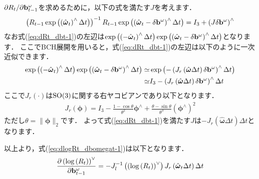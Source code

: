 $\partial R_{t} / \partial {\bf b}_{t-1}^{\omega}$を求めるために，以下の式を満たす$J$を考えます．
%
\begin{align}
  \left( R_{t-1} \exp \left( \left( \hat{ \boldsymbol \omega }_{t} \right)^{\wedge} \Delta t \right) \right)^{-1} R_{t-1} \exp \left( \left( \hat{ \boldsymbol \omega }_{t} - \delta {\bf b}^{\omega} \right)^{\wedge} \Delta t \right)
  = 
  I_{3} + \left( J \delta {\bf b}^{\omega} \right)^{\wedge}
  \label{eq:dRt_dbt-1}
\end{align}
%
なお式(\ref{eq:dRt_dbt-1})の左辺は$\exp \left( \left( - \hat{ \boldsymbol \omega }_{t} \right)^{\wedge} \Delta t \right) \exp \left( \left( \hat{ \boldsymbol \omega }_{t} - \delta {\bf b}^{\omega} \right)^{\wedge} \Delta t \right)$となります．
ここでBCH展開を用いると，式(\ref{eq:dRt_dbt-1})の左辺は以下のように一次近似できます．
%
\begin{align}
  \begin{split}
    \exp \left( \left( - \hat{ \boldsymbol \omega }_{t} \right)^{\wedge} \Delta t \right) \exp \left( \left( \hat{ \boldsymbol \omega }_{t} - \delta {\bf b}^{\omega} \right)^{\wedge} \Delta t \right)
%
    \simeq &
%
    \exp \left( - \left( J_{r} \left( \hat{ \boldsymbol \omega } \Delta t \right) \delta {\bf b}^{\omega} \right)^{\wedge} \Delta t \right) \\
%
    \simeq & 
%
    I_{3} - \left( J_{r} \left( \hat{ \boldsymbol \omega } \Delta t \right) \delta {\bf b}^{\omega} \right)^{\wedge} \Delta t
  \end{split}
\end{align}
%
ここで$J_{r} \left( \cdot \right)$は${\rm SO}(3)$に関する右ヤコビアンであり以下となります．
%
\begin{align}
  J_{r} \left( \boldsymbol \phi \right)
  =
  I_{3} -
  \frac{ 1 - \cos \theta }{ \theta^{2} } \boldsymbol \phi^{\wedge} +
  \frac{ \theta - \sin \theta }{ \theta^{3} } \left( \boldsymbol \phi^{\wedge} \right)^{2}
\end{align}
%
ただし$\theta = \| \boldsymbol \phi \|_{2}$です．
よって式(\ref{eq:dRt_dbt-1})を満たす$J$は$- J_{r} \left( \hat{ \boldsymbol \omega } \Delta t \right) \Delta t$となります．

以上より，式(\ref{eq:dlogRt_dbomegat-1})は以下となります．
%
\begin{align}
  \frac{ \partial \left( \log \left( R_{t} \right) \right)^{\vee} }{ \partial {\bf b}_{t-1}^{\omega} }
  =
  - J_{l}^{-1} \left( \left( \log \left( R_{t} \right) \right)^{\vee} \right)
  J_{r} \left( \hat{ \boldsymbol \omega }_{t} \Delta t \right) \Delta t
\end{align}

